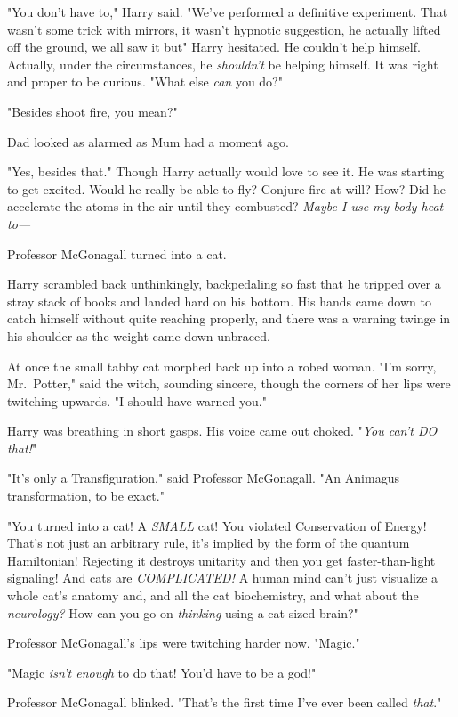 "You don't have to," Harry said. "We've performed a definitive
experiment. That wasn't some trick with mirrors, it wasn't
hypnotic suggestion, he actually lifted off the ground, we all
saw it{\el} but{\el}" Harry hesitated. He couldn't help himself.
Actually, under the circumstances, he \emph{shouldn't} be helping
himself. It was right and proper to be curious. "What else
\emph{can} you do?"

"Besides shoot fire, you mean?"

Dad looked as alarmed as Mum had a moment ago.

"Yes, besides that." Though Harry actually would love to
see it. He was starting to get excited. Would he really be
able to fly? Conjure fire at will? How? Did he accelerate
the atoms in the air until they combusted? \emph{Maybe I use
my body heat to—}

Professor McGonagall turned into a cat.

Harry scrambled back unthinkingly, backpedaling so fast that he tripped over a
stray stack of books and landed hard on his bottom. His
hands came down to catch himself without quite reaching properly, and there was
a warning twinge in his shoulder as the weight came down unbraced.

At once the small tabby cat morphed back up into a robed woman. "I'm sorry,
Mr.~Potter," said the witch, sounding sincere, though the corners of her lips
were twitching upwards. "I should have warned you."

Harry was breathing in short gasps. His voice came out choked.
"\emph{You can't DO that!}"

"It's only a Transfiguration," said Professor McGonagall. "An Animagus
transformation, to be exact."

"You turned into a cat! A \emph{SMALL} cat! You violated Conservation of
Energy! That's not just an arbitrary rule, it's implied by the form of the
quantum Hamiltonian! Rejecting it destroys unitarity
and then you get faster-than-light signaling!
And cats are \emph{COMPLICATED!} A human mind can't just visualize
a whole cat's anatomy and, and all the cat biochemistry, and what about the
\emph{neurology?} How can you go on \emph{thinking} using a cat-sized brain?"

Professor McGonagall's lips were twitching harder now. "Magic."

"Magic \emph{isn't enough} to do that! You'd have to be a god!"

Professor McGonagall blinked. "That's the first time I've ever been called
\emph{that}."

